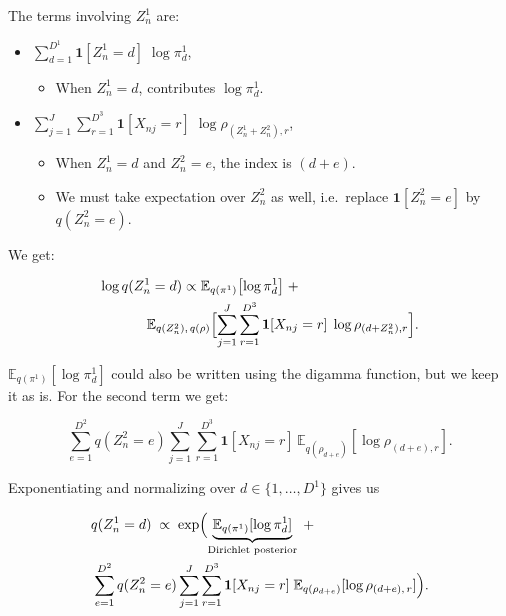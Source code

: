 \documentclass{article}
\begin{document}
\begin{multicols}{2}
    The terms involving \(Z_n^1\) are:
    \begin{itemize}
        \item \(\sum_{d=1}^{D^1} \mathbf{1}[Z_n^1=d]\;\log \pi^1_d\),
        \begin{itemize}
            \item When \(Z_n^1 = d\), contributes \(\log \pi^1_d\).
        \end{itemize}
        \item \(\sum_{j=1}^J \sum_{r=1}^{D^3} \mathbf{1}[X_{nj}=r]\;\log \rho_{(Z_n^1+Z_n^2),r}\),
        \begin{itemize}
            \item When \(Z_n^1=d\) and \(Z_n^2=e\), the index is \((d+ e)\).
            \item We must take expectation over \(Z_n^2\) as well, i.e.\ replace \(\mathbf{1}[Z_n^2 = e]\) by \(q(Z_n^2 = e)\).
        \end{itemize}
    \end{itemize}

    We get:

    
    \begin{align*}
    \log q(Z_n^1 = d)
    \propto
    \mathbb{E}_{q(\pi^1)}&\bigl[\log \pi^1_d\bigr]
    \;+\\\;
    \mathbb{E}_{q(Z_n^2),\,q(\rho)}\Bigl[
    \sum_{j=1}^J &\sum_{r=1}^{D^3} \mathbf{1}[X_{nj}=r]\;\log \rho_{(d + Z_n^2),r}
    \Bigr].
    \end{align*}
    
    \(\mathbb{E}_{q(\pi^1)}[\log \pi^1_d]\) could also be written using the digamma function, but we keep it as is. For the second term we get:

    \[
        \sum_{e=1}^{D^2} q(Z_n^2 = e)
        \sum_{j=1}^J
        \sum_{r=1}^{D^3} \mathbf{1}[X_{nj}=r]\,\mathbb{E}_{q(\rho_{d+e})}[\log \rho_{(d+e),r}].
    \]

    Exponentiating and normalizing over \(d\in\{1,\dots,D^1\}\) gives us

    \begin{align*}
        q(Z_n^1 = d)
        \;\propto\;
        \exp&\Bigl(
        \underbrace{\mathbb{E}_{q(\pi^1)}[\log \pi^1_d]}_{\text{Dirichlet posterior}}
        \;+\\\;
        \sum_{e=1}^{D^2} q(Z_n^2 = e)
            \sum_{j=1}^J &\sum_{r=1}^{D^3}
            \mathbf{1}[X_{nj}=r]\;\mathbb{E}_{q(\rho_{d+e})}[\log \rho_{(d+e),\,r}]
        \Bigr).
    \end{align*}


\end{multicols}
\end{document}
